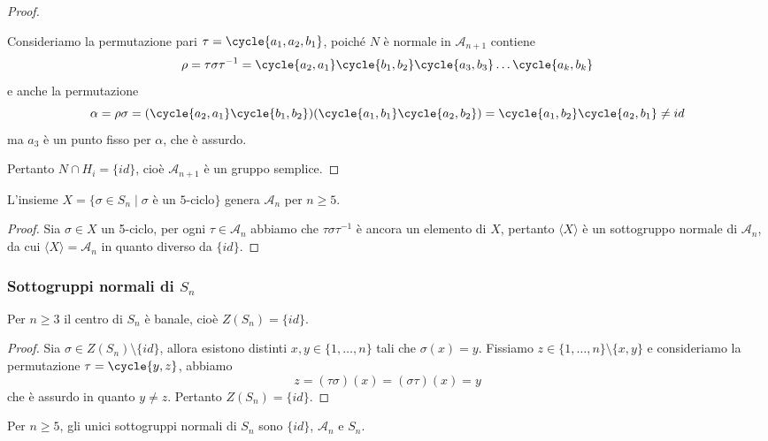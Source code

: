 \documentclass[11pt]{scrartcl}
\begin{document}
\begin{proof}
\begin{itemize}
        Consideriamo la permutazione pari $\tau = \cycle{a_1, a_2, b_1}$,
        poiché $N$ è normale in $\mathcal{A}_{n + 1}$ contiene
        \[
            \rho = \tau\sigma\tau^{-1} = \cycle{a_2, a_1}\cycle{b_1, b_2}
            \cycle{a_3, b_3}\ldots\cycle{a_k, b_k}
        \]
        e anche la permutazione 
        \[
            \alpha = \rho\sigma = (\cycle{a_2, a_1}\cycle{b_1, b_2})
            (\cycle{a_1, b_1}\cycle{a_2, b_2}) = \cycle{a_1, b_2}\cycle{a_2, b_1} \neq id
        \]
        ma $a_3$ è un punto fisso per $\alpha$, che è assurdo.
    \end{itemize}
    Pertanto $N\cap H_i = \{id\}$, cioè $\mathcal{A}_{n + 1}$ è un gruppo semplice.
\end{proof}

\begin{corollary}
    L'insieme $X = \{\sigma \in S_n\mid \sigma \text{ è un 5-ciclo}\}$ genera
    $\mathcal{A}_n$ per $n \geqslant 5$.
\end{corollary}

\begin{proof}
    Sia $\sigma \in X$ un 5-ciclo, per ogni $\tau \in \mathcal{A}_n$
    abbiamo che $\tau\sigma\tau^{-1}$ è ancora un elemento di $X$, pertanto
    $\langle X\rangle$ è un sottogruppo normale di $\mathcal{A}_n$, da cui 
    $\langle X \rangle = \mathcal{A}_n$ in quanto diverso da $\{id\}$.
\end{proof}


\subsubsection{Sottogruppi normali di $S_n$}

\begin{lemma}
    \label{lemma1.65}
    Per $n \geq 3$ il centro di $S_n$ è banale, cioè $Z(S_n) = \{id\}$.
\end{lemma}

\begin{proof}
    Sia $\sigma \in Z(S_n) \setminus \{id\}$, allora esistono distinti 
    $x, y \in \{1, \ldots, n\}$ tali che $\sigma(x) = y$. Fissiamo 
    $z \in \{1, \ldots, n\}\setminus \{x, y\}$ e consideriamo la permutazione
    $\tau = \cycle{y, z}$, abbiamo
    \[
        z = (\tau\sigma)(x) = (\sigma\tau)(x) = y
    \]
    che è assurdo in quanto $y \neq z$. Pertanto $Z(S_n) = \{id\}$.
\end{proof}

\begin{proposition}
    Per $n\geq 5$, gli unici sottogruppi normali di $S_n$ sono $\{id\}$,
    $\mathcal{A}_n$ e $S_n$.
\end{proposition}
\end{document}
